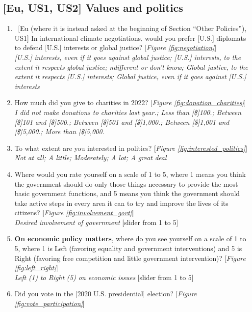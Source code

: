 \subsection*{[Eu, US1, US2] Values and politics}
\begin{enumerate}[resume] \item ~[Eu (where it is instead asked at the beginning of Section ``Other Policies''), US1] \label{q:negotiation} In international climate negotiations, would you prefer [U.S.] diplomats to defend [U.S.] interests or global justice? [\textit{Figure \ref{fig:negotiation}}]
\\ \textit{[U.S.] interests, even if it goes against global justice; [U.S.] interests, to the extent it respects global justice; ndifferent or don't know; Global justice, to the extent it respects [U.S.] interests; Global justice, even if it goes against [U.S.] interests}
\item \label{q:donation_charities} How much did you give to charities in 2022? [\textit{Figure \ref{fig:donation_charities}}]
\\ \textit{I did not make donations to charities last year.; Less than [\$]100.; Between [\$]101 and [\$]500.; Between [\$]501 and [\$]1,000.; Between [\$]1,001 and [\$]5,000.; More than [\$]5,000.}
\item \label{q:interested_politics} To what extent are you interested in politics? [\textit{Figure \ref{fig:interested_politics}}]
\\ \textit{Not at all; A little; Moderately; A lot; A great deal}
\item \label{q:involvement_govt} Where would you rate yourself on a scale of 1 to 5, where 1 means you think the government should do only those things necessary to provide the most basic government functions, and 5 means you think the government should take active steps in every area it can to try and improve the lives of its citizens? [\textit{Figure \ref{fig:involvement_govt}}]
\\ \textit{Desired involvement of government} [slider from 1 to 5]
\item \label{q:left_right} \textbf{On economic policy matters}, where do you see yourself on a scale of 1 to 5, where 1 is Left (favoring equality and government interventions) and 5 is Right (favoring free competition and little government intervention)? [\textit{Figure \ref{fig:left_right}}]
\\ \textit{Left (1) to Right (5) on economic issues} [slider from 1 to 5]
\item \label{q:vote_participation} Did you vote in the [2020 U.S. presidential] election?  [\textit{Figure \ref{fig:vote_participation}}]

\end{enumerate}
